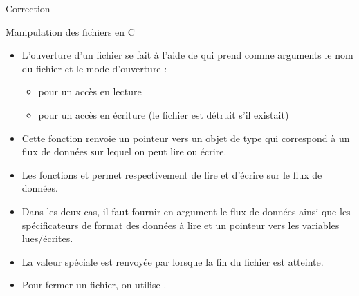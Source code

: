 \documentclass[10pt]{beamer}
\begin{document}
\begin{frame}[fragile]{\Ctitle}{\stitle}
	\begin{exampleblock}{Correction}
	\end{exampleblock}
\end{frame}

\begin{frame}[fragile]{\Ctitle}{\stitle}
	\begin{block}{Manipulation des fichiers en C}
		\begin{itemize}
			\item<1-> L'ouverture d'un fichier se fait à l'aide de  qui prend comme arguments le nom du fichier et le mode d'ouverture :
				\begin{itemize}
					\item<2->  pour un accès en lecture
					\item<3->  pour un accès en écriture (le fichier est détruit s'il existait)
				\end{itemize}
			\item<4-> Cette fonction renvoie un pointeur vers un objet de type  qui correspond à un flux de données sur lequel on peut lire ou écrire.
			\item<5-> Les fonctions   et  permet respectivement de lire et d'écrire sur le flux de données.
			\item<6-> Dans les deux cas, il faut fournir en argument le flux de données ainsi que les spécificateurs de format des données à lire et un pointeur vers les variables lues/écrites.
			\item<7-> La valeur spéciale  est renvoyée par  lorsque la fin du fichier est atteinte.
			\item<8-> Pour fermer un fichier, on utilise .
		\end{itemize}
	\end{block}
\end{frame}
\end{document}
